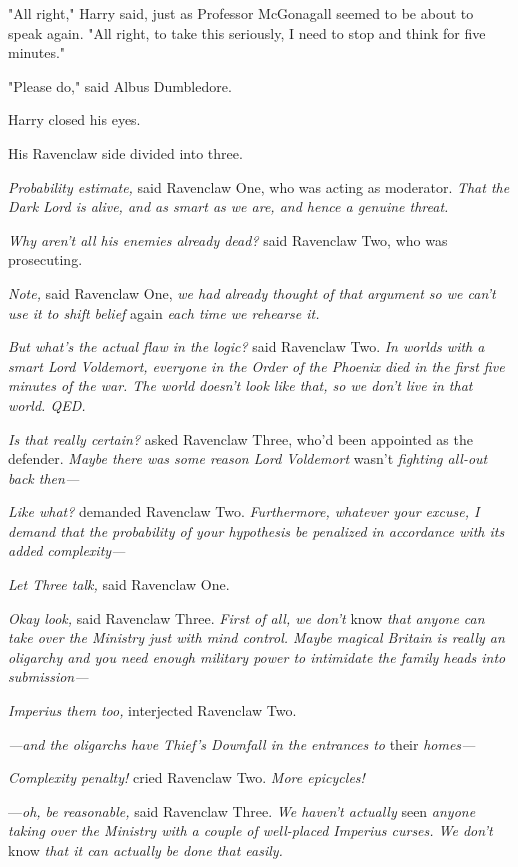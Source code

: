 "All right," Harry said, just as Professor McGonagall seemed to be about to
speak again. "All right, to take this seriously, I need to stop and think for
five minutes."

"Please do," said Albus Dumbledore.

Harry closed his eyes.

His Ravenclaw side divided into three.

\emph{Probability estimate,} said Ravenclaw One, who was acting as moderator.
\emph{That the Dark Lord is alive, and as smart as we are, and hence a genuine
threat.}

\emph{Why aren't all his enemies already dead?} said Ravenclaw Two, who was
prosecuting.

\emph{Note,} said Ravenclaw One, \emph{we had already thought of that argument
so we can't use it to shift belief} again \emph{each time we rehearse it.}

\emph{But what's the actual flaw in the logic?} said Ravenclaw Two. \emph{In
worlds with a smart Lord Voldemort, everyone in the Order of the Phoenix died
in the first five minutes of the war. The world doesn't look like that, so we
don't live in that world. QED.}

\emph{Is that really certain?} asked Ravenclaw Three, who'd been appointed as
the defender. \emph{Maybe there was some reason Lord Voldemort} wasn't
\emph{fighting all-out back then---}

\emph{Like what?} demanded Ravenclaw Two. \emph{Furthermore, whatever your
excuse, I demand that the probability of your hypothesis be penalized in
accordance with its added complexity---}

\emph{Let Three talk,} said Ravenclaw One.

\emph{Okay{\el} look,} said Ravenclaw Three. \emph{First of all, we don't}
know \emph{that anyone can take over the Ministry just with mind control. Maybe
magical Britain is really an oligarchy and you need enough military power to
intimidate the family heads into submission---}

\emph{Imperius them too,} interjected Ravenclaw Two.

\emph{---and the oligarchs have Thief's Downfall in the entrances to}
their \emph{homes---}

\emph{Complexity penalty!} cried Ravenclaw Two. \emph{More epicycles!}

---\emph{oh, be reasonable,} said Ravenclaw Three. \emph{We haven't actually}
seen \emph{anyone taking over the Ministry with a couple of well-placed
Imperius curses. We don't} know \emph{that it can actually be done that easily.}

